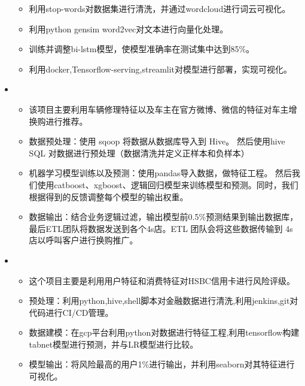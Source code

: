 \begin{itemize}[leftmargin=*]
{\begin{itemize}
       \item 利用stop-words对数据集进行清洗，并通过wordcloud进行词云可视化。
       \item 利用python gensim word2vec对文本进行向量化处理。
       \item 训练并调整bi-lstm模型，使模型准确率在测试集中达到85\%。
       \item 利用docker,Tensorflow-serving,streamlit对模型进行部署，实现可视化。
      \end{itemize}
      }
    \item
      {\small
      \begin{itemize}
       \item 该项目主要利用车辆修理特征以及车主在官方微博、微信的特征对车主增换购进行推荐。
       \item 数据预处理：使用 sqoop 将数据从数据库导入到 Hive。 然后使用hive SQL 对数据进行预处理（数据清洗并定义正样本和负样本）
       \item 机器学习模型训练以及预测：使用pandas导入数据，做特征工程。 然后我们使用catboost、xgboost、逻辑回归模型来训练模型和预测。同时，我们根据得到的反馈调整每个模型的输出权重。
       \item 数据输出：结合业务逻辑过滤，输出模型前0.5\%预测结果到输出数据库，最后ETL团队将数据发送到各个4s店。ETL 团队会将这些数据传输到 4s 店以呼叫客户进行换购推广。
      \end{itemize}
      }
    \item
      {\small
      \begin{itemize}
      
       \item 这个项目主要是利用用户特征和消费特征对HSBC信用卡进行风险评级。
       \item 预处理：利用python,hive,shell脚本对金融数据进行清洗,利用jenkins,git对代码进行CI/CD管理。
       \item 数据建模：在gcp平台利用python对数据进行特征工程,利用tensorflow构建tabnet模型进行预测，并与LR模型进行比较。
       \item 模型输出：将风险最高的用户1\%进行输出，并利用seaborn对其特征进行可视化。
      \end{itemize}
      }




  \end{itemize}



















